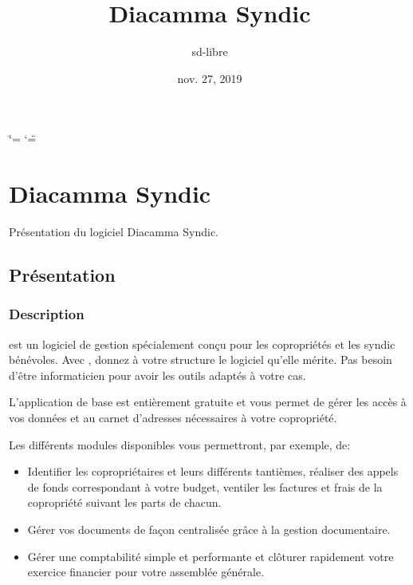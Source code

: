 \documentclass[a4paper,10pt,oneside,french]{sphinxmanual}
\title{Diacamma Syndic}
\date{nov. 27, 2019}
\author{sd-libre}
\begin{document}
\ifdefined\shorthandoff
  \ifnum\catcode`\=\string=\active\shorthandoff{=}\fi
  \ifnum\catcode`\"=\active{}\fi
\fi

\pagestyle{empty}
\sphinxmaketitle
\pagestyle{plain}
\sphinxtableofcontents
\pagestyle{normal}
\label{\detokenize{index::doc}}



\chapter{Diacamma Syndic}
\label{\detokenize{syndic/index:diacamma-syndic}}\label{\detokenize{syndic/index::doc}}
Présentation du logiciel Diacamma Syndic.


\section{Présentation}
\label{\detokenize{syndic/presentation:presentation}}\label{\detokenize{syndic/presentation::doc}}

\subsection{Description}
\label{\detokenize{syndic/presentation:description}}
 est un logiciel de gestion spécialement conçu pour les copropriétés et les syndic bénévoles.
Avec , donnez à votre structure le logiciel qu’elle mérite. Pas besoin d’être informaticien pour avoir les outils adaptés à votre cas.

L’application de base est entièrement gratuite et vous permet de gérer les accès à vos données et au carnet d’adresses nécessaires à votre copropriété.

Les différents modules disponibles vous permettront, par exemple, de:
\begin{itemize}
\item {} 
Identifier les copropriétaires et leurs différents tantièmes, réaliser des appels de fonds correspondant à votre budget, ventiler les factures et frais de la copropriété suivant les parts de chacun.

\item {} 
Gérer vos documents de façon centralisée grâce à la gestion documentaire.

\item {} 
Gérer une comptabilité simple et performante et clôturer rapidement votre exercice financier pour votre assemblée générale.

\end{itemize}
\end{document}
